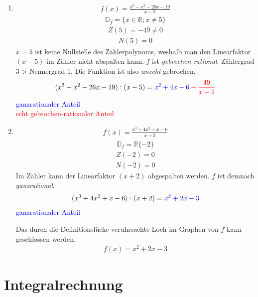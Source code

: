 \documentclass[12pt, a4paper]{report}
\begin{document}
\begin{fleqn}[\parindent]
\begin{enumerate}
\item
\begin{align*}
f(x)=\frac{x^3-x^2-26x-19}{x-5}
\end{align*}
\begin{align*}
\mathbb{D}_f = \{x\in \mathbb{R}; x \neq 5\}
\end{align*}
\begin{align*}
Z(5)=-49 \neq 0
\end{align*}
\begin{align*}
N(5)=0
\end{align*}
$x=5$ ist keine Nullstelle des Zählerpolynoms, weshalb man den Linearfaktor $(x-5)$ im Zähler nicht abspalten kann. $f$ ist \textit{gebrochen-rational}. Zählergrad 3 > Nennergrad 1. Die Funktion ist also \textit{unecht} gebrochen.
\begin{align*}
(x^3-x^2-26x-19):(x-5)=\color{blue}x^2+4x-6\color{red}-\frac{49}{x-5}
\end{align*}
\textcolor{blue}{ganzrationaler Anteil}\\
\textcolor{red}{echt gebrochen-rationaler Anteil}

\item
\begin{align*}
f(x)=\frac{x^3+4x^2+x-6}{x+2}
\end{align*}
\begin{align*}
\mathbb{D}_f = \mathbb{R}\{-2\}
\end{align*}
\begin{align*}
Z(-2)=0
\end{align*}
\begin{align*}
N(-2)=0
\end{align*}
Im Zähler kann der Linearfaktor $(x+2)$ abgespalten werden. $f$ ist demnach \textit{ganzrational}.
\begin{align*}
(x^3+4x^2+x-6):(x+2)=\color{blue}x^2+2x-3
\end{align*}
\textcolor{blue}{ganzrationaler Anteil}

Das durch die Definitionslücke veruhrsachte Loch im Graphen von $f$ kann geschlossen werden.
\begin{align*}
f(x)=x^2+2x-3
\end{align*}
\end{enumerate}
\end{fleqn}




\chapter{Integralrechnung}
\end{document}
